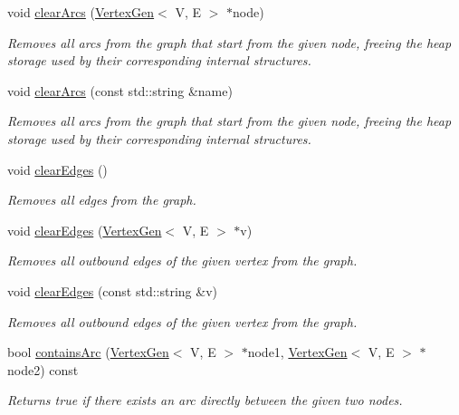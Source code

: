\begin{DoxyCompactItemize}
void \mbox{\hyperlink{classGraph_a14def9e68896088fec7839e5da4fed27}{clear\+Arcs}} (\mbox{\hyperlink{classVertexGen}{Vertex\+Gen}}$<$ V, E $>$ $\ast$node)
\begin{DoxyCompactList}\small\item\em Removes all arcs from the graph that start from the given node, freeing the heap storage used by their corresponding internal structures. \end{DoxyCompactList}\item 
void \mbox{\hyperlink{classGraph_a2d8ecb9c6768fff244b2be46319385cc}{clear\+Arcs}} (const std\+::string \&name)
\begin{DoxyCompactList}\small\item\em Removes all arcs from the graph that start from the given node, freeing the heap storage used by their corresponding internal structures. \end{DoxyCompactList}\item 
void \mbox{\hyperlink{classBasicGraphGen_aced46bbfe5973602cbd67ac6188c36db}{clear\+Edges}} ()
\begin{DoxyCompactList}\small\item\em Removes all edges from the graph. \end{DoxyCompactList}\item 
void \mbox{\hyperlink{classBasicGraphGen_ac3104a246e5eaa7701c96bf52038c6b0}{clear\+Edges}} (\mbox{\hyperlink{classVertexGen}{Vertex\+Gen}}$<$ V, E $>$ $\ast$v)
\begin{DoxyCompactList}\small\item\em Removes all outbound edges of the given vertex from the graph. \end{DoxyCompactList}\item 
void \mbox{\hyperlink{classBasicGraphGen_a206c104818fb8653db07b7f4a3d5fe11}{clear\+Edges}} (const std\+::string \&v)
\begin{DoxyCompactList}\small\item\em Removes all outbound edges of the given vertex from the graph. \end{DoxyCompactList}\item 
bool \mbox{\hyperlink{classGraph_a9ca50139471975b82fdc6b1977bcfa4a}{contains\+Arc}} (\mbox{\hyperlink{classVertexGen}{Vertex\+Gen}}$<$ V, E $>$ $\ast$node1, \mbox{\hyperlink{classVertexGen}{Vertex\+Gen}}$<$ V, E $>$ $\ast$node2) const
\begin{DoxyCompactList}\small\item\em Returns true if there exists an arc directly between the given two nodes. \end{DoxyCompactList}\item 

\end{DoxyCompactItemize}
